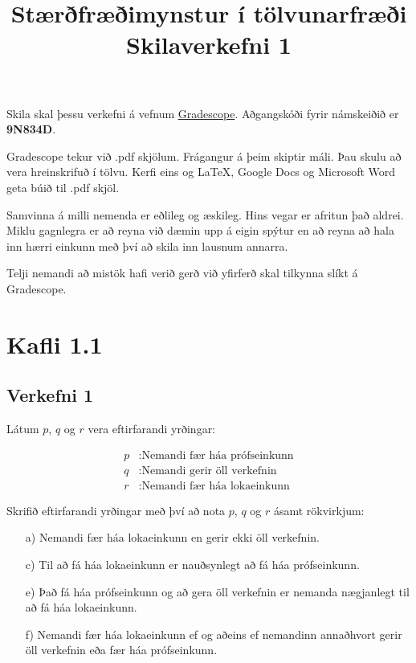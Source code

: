 \documentclass{article}
\title{Stærðfræðimynstur í tölvunarfræði \\ Skilaverkefni 1}
\author{}
\begin{document}
\maketitle

Skila skal þessu verkefni á vefnum \href{https://gradescope.com/courses/9487}{Gradescope}. Aðgangskóði fyrir námskeiðið er \textbf{9N834D}.

Gradescope tekur við .pdf skjölum. Frágangur á þeim skiptir máli. Þau skulu að vera hreinskrifuð í tölvu. Kerfi eins og \LaTeX, Google Docs og Microsoft Word geta búið til .pdf skjöl.

Samvinna á milli nemenda er eðlileg og æskileg. Hins vegar er afritun það aldrei. Miklu gagnlegra er að reyna við dæmin upp á eigin spýtur en að reyna að hala inn hærri einkunn með því að skila inn lausnum annarra.

Telji nemandi að mistök hafi verið gerð við yfirferð skal tilkynna slíkt á Gradescope.

\section{Kafli 1.1}
\subsection{Verkefni 1}
Látum $p$, $q$ og $r$ vera eftirfarandi yrðingar:

\begin{align*}
p &: \text{Nemandi fær háa prófseinkunn}\\
q &: \text{Nemandi gerir öll verkefnin}\\
r &: \text{Nemandi fær háa lokaeinkunn}
\end{align*}

Skrifið eftirfarandi yrðingar með því að nota $p$, $q$ og $r$ ásamt rökvirkjum:

\begin{itemize}
    \item[a)] Nemandi fær háa lokaeinkunn en gerir ekki öll verkefnin.
    \item[c)] Til að fá háa lokaeinkunn er nauðsynlegt að fá háa prófseinkunn.
    \item[e)] Það fá háa prófseinkunn og að gera öll verkefnin er nemanda nægjanlegt til að fá háa lokaeinkunn.
    \item[f)] Nemandi fær háa lokaeinkunn ef og aðeins ef nemandinn annaðhvort gerir öll verkefnin eða fær háa prófseinkunn.
\end{itemize}
\end{document}
